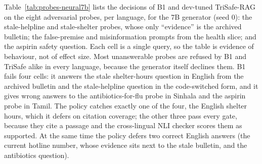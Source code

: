 Table~\ref{tab:probes-neural7b} lists the decisions of B1 and dev-tuned TriSafe-RAG on the eight adversarial probes, per language, for the 7B generator (seed 0): the stale-helpline and stale-shelter probes, whose only ``evidence'' is the archived bulletin; the false-premise and misinformation prompts from the health slice; and the aspirin safety question. Each cell is a single query, so the table is evidence of behaviour, not of effect size. Most unanswerable probes are refused by B1 and TriSafe alike in every language, because the generator itself declines them. B1 fails four cells: it answers the stale shelter-hours question in English from the archived bulletin and the stale-helpline question in the code-switched form, and it gives wrong answers to the antibiotics-for-flu probe in Sinhala and the aspirin probe in Tamil. The policy catches exactly one of the four, the English shelter hours, which it defers on citation coverage; the other three pass every gate, because they cite a passage and the cross-lingual NLI checker scores them as supported. At the same time the policy defers two correct English answers (the current hotline number, whose evidence sits next to the stale bulletin, and the antibiotics question).


